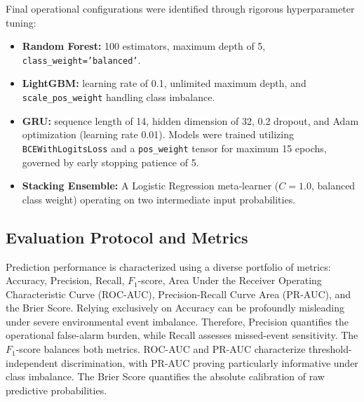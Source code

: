 Final operational configurations were identified through rigorous hyperparameter tuning:
\begin{itemize}
    \item \textbf{Random Forest:} 100 estimators, maximum depth of 5, \texttt{class\_weight='balanced'}.
    \item \textbf{LightGBM:} learning rate of 0.1, unlimited maximum depth, and \texttt{scale\_pos\_weight} handling class imbalance.
    \item \textbf{GRU:} sequence length of 14, hidden dimension of 32, 0.2 dropout, and Adam optimization (learning rate 0.01). Models were trained utilizing \texttt{BCEWithLogitsLoss} and a \texttt{pos\_weight} tensor for maximum 15 epochs, governed by early stopping patience of 5.
    \item \textbf{Stacking Ensemble:} A Logistic Regression meta-learner ($C=1.0$, balanced class weight) operating on two intermediate input probabilities.
\end{itemize}

\subsection{Evaluation Protocol and Metrics}
Prediction performance is characterized using a diverse portfolio of metrics: Accuracy, Precision, Recall, $F_1$-score, Area Under the Receiver Operating Characteristic Curve (ROC-AUC), Precision-Recall Curve Area (PR-AUC), and the Brier Score. Relying exclusively on Accuracy can be profoundly misleading under severe environmental event imbalance. Therefore, Precision quantifies the operational false-alarm burden, while Recall assesses missed-event sensitivity. The $F_1$-score balances both metrics. ROC-AUC and PR-AUC characterize threshold-independent discrimination, with PR-AUC proving particularly informative under class imbalance. The Brier Score quantifies the absolute calibration of raw predictive probabilities.

